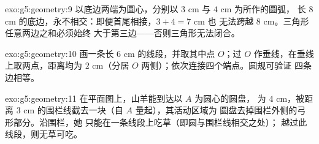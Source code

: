 \begin{solution}{exo:g5:geometry:9}
以底边两端为圆心，分别以 $3$ cm 与 $4$ cm 为所作的圆弧，
长 $8$ cm 的底边，永不相交：即便首尾相接，$3 + 4 = 7$ cm 也
无法跨越 $8$ cm。三角形任意两边之和必须始终
大于第三边——否则三角形无法闭合。
\end{solution}

\begin{solution}{exo:g5:geometry:10}
画一条长 $6$ cm 的线段，并取其中点 $O$；过
$O$ 作垂线，在垂线上取两点，距离均为
$2$ cm（分居 $O$ 两侧）；依次连接四个端点。圆规可验证
四条边相等。
\end{solution}

\begin{solution}{exo:g5:geometry:11}
在平面图上，山羊能到达以 $A$ 为圆心的圆盘，
为 $4$ cm，被距离 $3$ cm 的围栏线截去一块（自 $A$ 量起），其活动区域为
圆盘去掉围栏外侧的弓形部分。沿围栏，她
只能在一条线段上吃草（即圆与围栏线相交之处）；
越过此线段，则无草可吃。
\end{solution}
